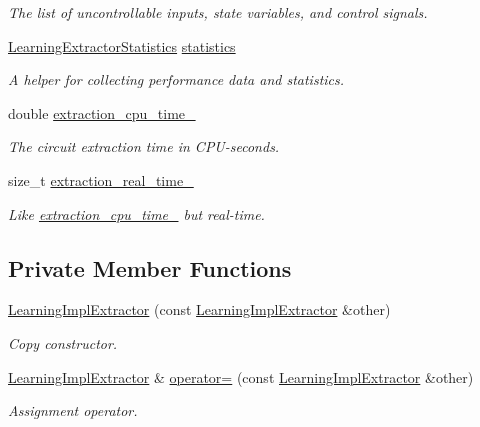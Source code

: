 \begin{DoxyCompactItemize}
\begin{DoxyCompactList}\small\item\em The list of uncontrollable inputs, state variables, and control signals. \end{DoxyCompactList}\item 
\hyperlink{classLearningExtractorStatistics}{Learning\-Extractor\-Statistics} \hyperlink{classLearningImplExtractor_a018564c4a67dfb228357008a8a50aef4}{statistics}
\begin{DoxyCompactList}\small\item\em A helper for collecting performance data and statistics. \end{DoxyCompactList}\item 
double \hyperlink{classCNFImplExtractor_ab8be06d42fd3c4b569ec22cfcf2f508e}{extraction\-\_\-cpu\-\_\-time\-\_\-}
\begin{DoxyCompactList}\small\item\em The circuit extraction time in C\-P\-U-\/seconds. \end{DoxyCompactList}\item 
size\-\_\-t \hyperlink{classCNFImplExtractor_ae06413cf08f868357d64545b3041aa18}{extraction\-\_\-real\-\_\-time\-\_\-}
\begin{DoxyCompactList}\small\item\em Like \hyperlink{classCNFImplExtractor_ab8be06d42fd3c4b569ec22cfcf2f508e}{extraction\-\_\-cpu\-\_\-time\-\_\-} but real-\/time. \end{DoxyCompactList}\end{DoxyCompactItemize}
\subsection*{Private Member Functions}
\begin{DoxyCompactItemize}
\item 
\hyperlink{classLearningImplExtractor_a12fcc34f855b823c407235b64673c4c2}{Learning\-Impl\-Extractor} (const \hyperlink{classLearningImplExtractor}{Learning\-Impl\-Extractor} \&other)
\begin{DoxyCompactList}\small\item\em Copy constructor. \end{DoxyCompactList}\item 
\hyperlink{classLearningImplExtractor}{Learning\-Impl\-Extractor} \& \hyperlink{classLearningImplExtractor_adfa15ed8fb085576deb3d15a55fe32e0}{operator=} (const \hyperlink{classLearningImplExtractor}{Learning\-Impl\-Extractor} \&other)
\begin{DoxyCompactList}\small\item\em Assignment operator. \end{DoxyCompactList}\end{DoxyCompactItemize}


